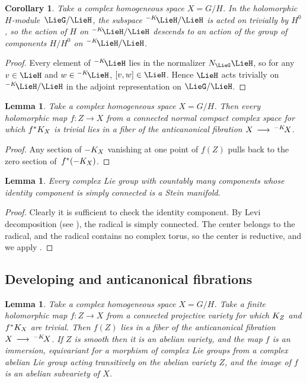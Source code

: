 \documentclass[11pt]{article}
\numberwithin{equation}{section}
\numberwithin{equation}{section}
\newtheorem{Corollary}[Theorem]{Corollary}
\newtheorem{Lemma}[Theorem]{Lemma}
\newcommand*{\acf}[1]{\Iitaka[\acb{}]{#1}}
\begin{document}
\begin{Corollary}\label{corollary:trivial.conn}
Take a complex homogeneous space $X = G/H$.
In the holomorphic $H$-mod\-ule~$\LieG/\LieH$, the subspace $\acf\LieH/\LieH$ is acted on trivially by $H^0$, so the action
of $H$ on $\acf\LieH/\LieH$ descends to an action of the group of components $H/H^0$ on $\acf\LieH/\LieH$.
\end{Corollary}

\begin{proof}
Every element of $\acf\LieH$ lies in the normalizer $N_{\LieG} \LieH$, so for any $v \in \LieH$ and $w \in
\acf\LieH$, $[v, w] \in \LieH$.
Hence $\LieH$ acts trivially on $\acf\LieH/\LieH$ in the adjoint representation on $\LieG/\LieH$.
\end{proof}

\begin{Lemma}\label{lemma:in.the.fiber}
Take a complex homogeneous space $X = G/H$.
Then every holomorphic map $f \colon Z \to X $ from a connected normal compact complex space for
which $f^*\cb{X}$ is trivial lies in a fiber of the anticanonical fibration $X \to \acf{X}$.
\end{Lemma}

\begin{proof}
Any section of $\acb{X}$ vanishing at one point of $f(Z)$ pulls back to the zero section of~$f^*(\acb{X})$.
\end{proof}

\begin{Lemma}\label{lemma:Stein.G}
Every complex Lie group with countably many components whose identity component is simply connected is a Stein manifold.
\end{Lemma}

\begin{proof}
Clearly it is sufficient to check the identity component.
By Levi decomposition (see \cite[Theorem 16.3.7]{Hilgert.Neeb:2012}), the radical is simply connected.
The center belongs to the radical, and the radical contains no complex torus, so the center is reductive, and we apply
\cite[Theorem 1]{Matsushima/Morimoto:1960}.
\end{proof}

\subsection{Developing and anticanonical fibrations}

\begin{Lemma}\label{lemma:ab.var.in.fiber}
Take a complex homogeneous space $X = G/H$.
Take a finite holomorphic map $f \colon Z\to X$ from a connected projective variety for which $\cb{Z}$ and $f^*\cb{X}$ are trivial.
Then $f(Z)$ lies in a fiber of the anticanonical fibration $X\to \acf{X}$.
If $Z$ is smooth then it is an abelian variety, and the map $f$ is an immersion, equivariant for a morphism of complex Lie groups from a complex abelian Lie group acting transitively on the abelian variety $Z$, and the image of $f$ is an abelian subvariety of $X$.
\end{Lemma}
\end{document}
